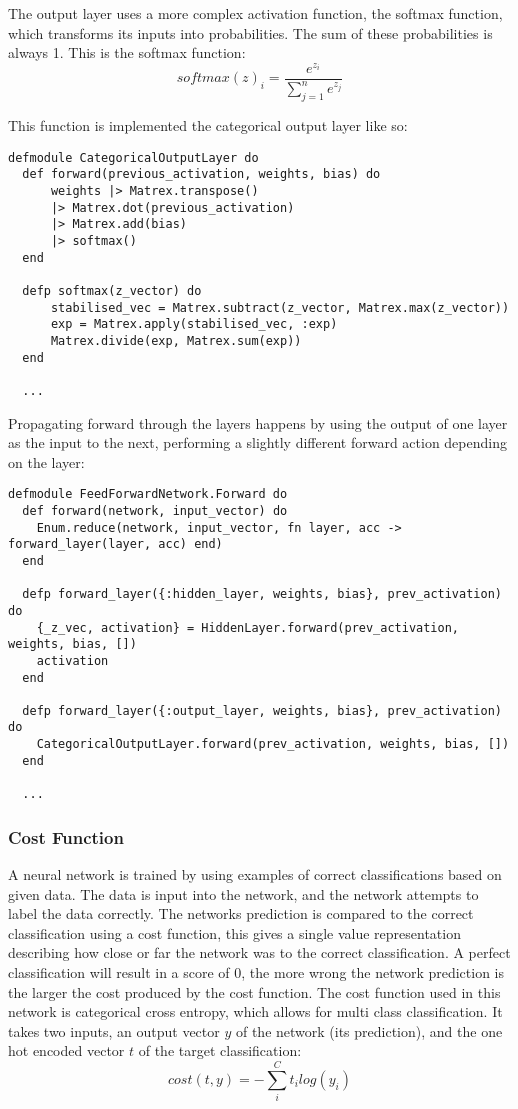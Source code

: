 The output layer uses a more complex activation function, the softmax function,
which transforms its inputs into probabilities. The sum of these probabilities
is always 1. This is the softmax function:
\begin{equation}
    softmax(z)_{i} = \frac{e^{z_{i}}}{\sum_{j=1}^{n} e^{z_{j}}}
\end{equation}

This function is implemented the categorical output layer like so:
\begin{lstlisting}
defmodule CategoricalOutputLayer do
  def forward(previous_activation, weights, bias) do
      weights |> Matrex.transpose()
      |> Matrex.dot(previous_activation)
      |> Matrex.add(bias)
      |> softmax()
  end

  defp softmax(z_vector) do
      stabilised_vec = Matrex.subtract(z_vector, Matrex.max(z_vector))
      exp = Matrex.apply(stabilised_vec, :exp)
      Matrex.divide(exp, Matrex.sum(exp))
  end

  ...
\end{lstlisting}

Propagating forward through the layers happens by using the output of one
layer as the input to the next, performing a slightly different forward action
depending on the layer:

\begin{lstlisting}
defmodule FeedForwardNetwork.Forward do
  def forward(network, input_vector) do
    Enum.reduce(network, input_vector, fn layer, acc -> forward_layer(layer, acc) end)
  end

  defp forward_layer({:hidden_layer, weights, bias}, prev_activation) do
    {_z_vec, activation} = HiddenLayer.forward(prev_activation, weights, bias, [])
    activation
  end

  defp forward_layer({:output_layer, weights, bias}, prev_activation) do
    CategoricalOutputLayer.forward(prev_activation, weights, bias, [])
  end

  ...
\end{lstlisting}

\subsubsection{Cost Function}
A neural network is trained by using examples of correct classifications based
on given data. The data is input into the network, and the network attempts to
label the data correctly. The networks prediction is compared to the correct
classification using a cost function, this gives a single value representation
describing how close or far the network was to the correct classification. A
perfect classification will result in a score of 0, the more wrong the network
prediction is the larger the cost produced by the cost function. The cost 
function used in this network is categorical cross entropy, which allows for
multi class classification. It takes two inputs, an output vector \(y\) of the network
(its prediction), and the one hot encoded vector \(t\) of the target classification:
\begin{equation}
    cost(t, y) = - \sum_{i}^{C} t_{i}log(y_{i})
\end{equation}

